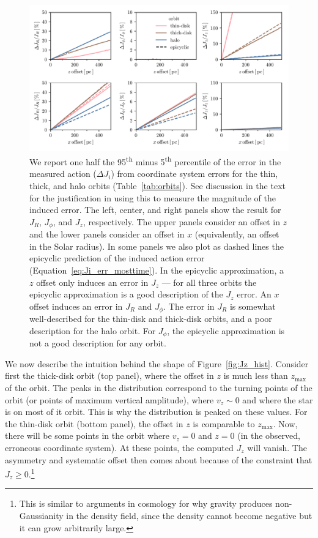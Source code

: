 \documentclass[twocolumn]{aastex62}
\newcommand{\uth}{\textsuperscript{th}}
\begin{document}
\begin{figure}[htb!]
\begin{center}
\includegraphics[width=\textwidth]{fig/schmactions_many_orbits.pdf}
\end{center}
\caption{We report one half the 95\uth{} minus 5\uth{} percentile of the error
in the measured action ($\Delta J_i$) from coordinate system errors for the
thin, thick, and halo orbits (Table~\ref{tab:orbits}). See discussion in the
text for the justification in using this to measure the magnitude of the
induced error. The left, center, and right panels show the result for $J_R$,
$J_{\phi}$, and $J_z$, respectively. The upper panels consider an offset in
$z$ and the lower panels consider an offset in $x$ (equivalently, an offset in
the Solar radius). In some panels we also plot as dashed lines the epicyclic
prediction of the induced action error (Equation~\eqref{eq:Ji_err_mosttime}).
In the epicyclic approximation, a $z$ offset only induces an error in $J_z$
--- for all three orbits the epicyclic approximation is a good description of
the $J_z$ error. An $x$ offset induces an error in $J_R$ and $J_{\phi}$. The
error in $J_R$ is somewhat well-described for the thin-disk and thick-disk
orbits, and a poor description for the halo orbit. For $J_{\phi}$, the
epicyclic approximation is not a good description for any orbit.}
\label{fig:many_orbit_wrong_ref}
\end{figure}

We now describe the intuition behind the shape of Figure~\ref{fig:Jz_hist}.
Consider first the thick-disk orbit (top panel), where the offset in $z$ is
much less than $z_{\text{max}}$ of the orbit. The peaks in the distribution
correspond to the turning points of the orbit (or points of maximum vertical
amplitude), where $v_z \sim 0$ and where the star is on most of it orbit. This
is why the distribution is peaked on these values. For the thin-disk orbit
(bottom panel), the offset in $z$ is comparable to $z_{\text{max}}$. Now,
there will be some points in the orbit where $v_z = 0$ and $z=0$ (in the
observed, erroneous coordinate system). At these points, the computed $J_z$
will vanish. The asymmetry and systematic offset then comes about because of
the constraint that $J_z \geq 0$.\footnote{This is similar to arguments in
cosmology for why gravity produces non-Gaussianity in the density field, since
the density cannot become negative but it can grow arbitrarily large.}
\end{document}

